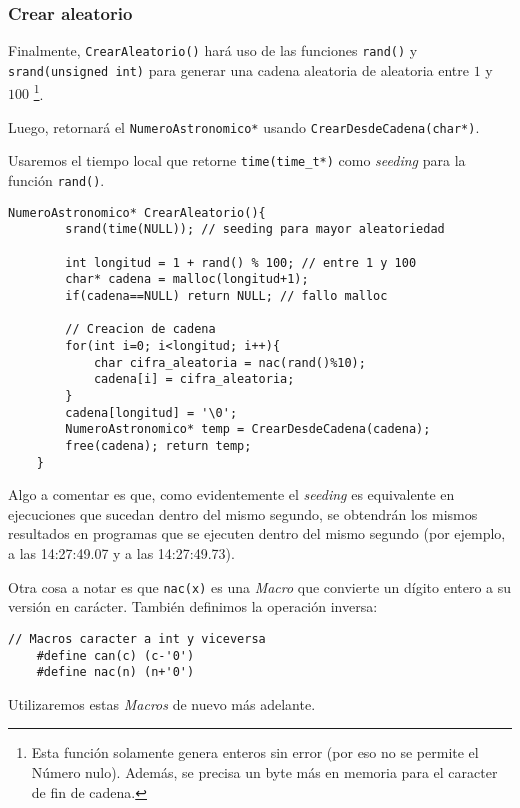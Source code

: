 \documentclass[a4paper, 12pt]{article}
\begin{document}
\subsubsection{Crear aleatorio}\label{crear-aleatorio}

Finalmente, \verb|CrearAleatorio()| hará uso de las funciones \verb|rand()| y \verb|srand(unsigned int)| para generar una cadena aleatoria de aleatoria entre $1$ y $100$ \footnote{Esta función solamente genera enteros sin error (por eso no se permite el Número nulo). Además, se precisa un byte más en memoria para el caracter de fin de cadena.}.

Luego, retornará el \verb|NumeroAstronomico*| usando \verb|CrearDesdeCadena(char*)|.

Usaremos el tiempo local que retorne \verb|time(time_t*)| como \emph{seeding} para la función \verb|rand()|.

\begin{lstlisting}[style=C]
    NumeroAstronomico* CrearAleatorio(){
        srand(time(NULL)); // seeding para mayor aleatoriedad
    
        int longitud = 1 + rand() % 100; // entre 1 y 100
        char* cadena = malloc(longitud+1);
        if(cadena==NULL) return NULL; // fallo malloc
        
        // Creacion de cadena
        for(int i=0; i<longitud; i++){
            char cifra_aleatoria = nac(rand()%10);
            cadena[i] = cifra_aleatoria;
        }
        cadena[longitud] = '\0';
        NumeroAstronomico* temp = CrearDesdeCadena(cadena);
        free(cadena); return temp;
    }
\end{lstlisting}

Algo a comentar es que, como evidentemente el \emph{seeding} es equivalente en ejecuciones que sucedan dentro del mismo segundo, se obtendrán los mismos resultados en programas que se ejecuten dentro del mismo segundo (por ejemplo, a las 14:27:49.07 y a las 14:27:49.73).

Otra cosa a notar es que \verb|nac(x)| es una \emph{Macro} que convierte un dígito entero a su versión en carácter. También definimos la operación inversa:

\label{macros-can-nac}
\begin{lstlisting}[style=C]
    // Macros caracter a int y viceversa
    #define can(c) (c-'0')
    #define nac(n) (n+'0')
\end{lstlisting}

Utilizaremos estas \emph{Macros} de nuevo más adelante.
\end{document}
